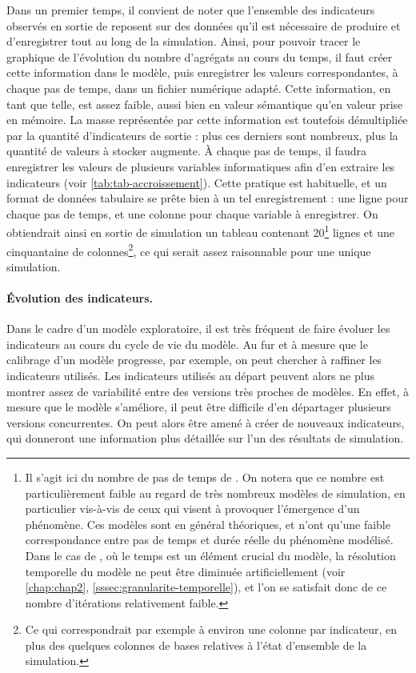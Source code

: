 Dans un premier temps, il convient de noter que l'ensemble des indicateurs observés en sortie de \simfeodal{} reposent sur des données qu'il est nécessaire de produire et d'enregistrer tout au long de la simulation.
Ainsi, pour pouvoir tracer le graphique de l'évolution du nombre d'agrégats au cours du temps, il faut créer cette information dans le modèle, puis enregistrer les valeurs correspondantes, à chaque pas de temps, dans un fichier numérique adapté.
Cette information, en tant que telle, est assez faible, aussi bien en valeur sémantique qu'en valeur prise en mémoire.
La masse représentée par cette information est toutefois démultipliée par la quantité d'indicateurs de sortie : plus ces derniers sont nombreux, plus la quantité de valeurs à stocker augmente.
À chaque pas de temps, il faudra enregistrer les valeurs de plusieurs variables informatiques afin d'en extraire les indicateurs (voir \cref{tab:tab-accroissement}).
Cette pratique est habituelle, et un format de données tabulaire se prête bien à un tel enregistrement : une ligne pour chaque pas de temps, et une colonne pour chaque variable à enregistrer.
On obtiendrait ainsi en sortie de simulation un tableau contenant 20\footnote{
	Il s'agit ici du nombre de pas de temps de \simfeodal{}.
	On notera que ce nombre est particulièrement faible au regard de très nombreux modèles de simulation, en particulier vis-à-vis de ceux qui visent à provoquer l'émergence d'un phénomène.
	Ces modèles sont en général théoriques, et n'ont qu'une faible correspondance entre pas de temps et durée réelle du phénomène modélisé.
	Dans le cas de \simfeodal{}, où le temps est un élément crucial du modèle, la résolution temporelle du modèle ne peut être diminuée artificiellement (voir \cref{chap:chap2}, \cref{sssec:granularite-temporelle}), et l'on se satisfait donc de ce nombre d'itérations relativement faible.
} lignes et une cinquantaine de colonnes\footnote{Ce qui correspondrait par exemple à environ une colonne par indicateur, en plus des quelques colonnes de bases relatives à l'état d'ensemble de la simulation.}, ce qui serait assez raisonnable pour une unique simulation.



\paragraph{Évolution des indicateurs.}
Dans le cadre d'un modèle exploratoire, il est très fréquent de faire évoluer les indicateurs au cours du cycle de vie du modèle.
Au fur et à mesure que le calibrage d'un modèle progresse, par exemple, on peut chercher à raffiner les indicateurs utilisés.
Les indicateurs utilisés au départ peuvent alors ne plus montrer assez de variabilité entre des versions très proches de modèles.
En effet, à mesure que le modèle s'améliore, il peut être difficile d'en départager plusieurs versions concurrentes.
On peut alors être amené à créer de nouveaux indicateurs, qui donneront une information plus détaillée sur l'un des résultats de simulation.


